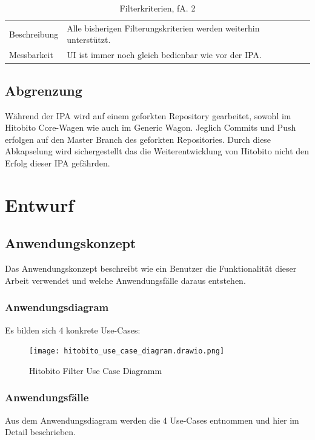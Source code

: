 \begin{table}[h!]
   \begin{tabular}{|L{0.3\textwidth}|L{0.6\textwidth}|}
       \hline
         \\[4pt]
       \hline
       Beschreibung & Alle bisherigen Filterungskriterien werden weiterhin unterstützt. \\
       \hline
       Messbarkeit & UI ist immer noch gleich bedienbar wie vor der IPA.  \\
       \hline
     \end{tabular}
     \caption{Filterkriterien, fA. 2}
\end{table}

\section{Abgrenzung}

Während der IPA wird auf einem geforkten Repository gearbeitet, sowohl im Hitobito Core-Wagen wie auch
im Generic Wagon. Jeglich Commits und Push erfolgen auf den Master Branch des geforkten Repositories. Durch diese 
Abkapselung wird sichergestellt das die Weiterentwicklung von Hitobito nicht den Erfolg dieser IPA gefährden. 
 
\chapter{Entwurf}
\section{Anwendungskonzept}
Das Anwendungskonzept beschreibt wie ein Benutzer die Funktionalität dieser Arbeit verwendet und welche Anwendungsfälle
daraus entstehen.


\subsection{Anwendungsdiagram}
Es bilden sich 4 konkrete Use-Cases:
\begin{figure}[h]
   \centering
   \texttt{[image: hitobito\_use\_case\_diagram.drawio.png]}
   \caption{Hitobito Filter Use Case Diagramm}
\end{figure}


\subsection{Anwendungsfälle}
Aus dem Anwendungsdiagram werden die 4 Use-Cases entnommen und hier im Detail beschrieben.

